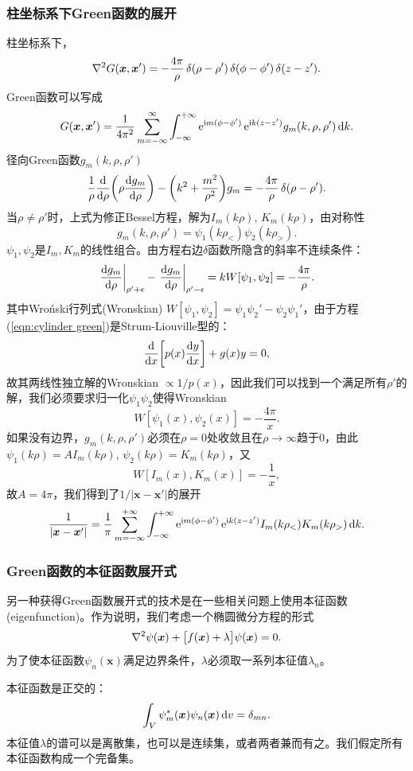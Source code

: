 \subsubsection{柱坐标系下Green函数的展开}
柱坐标系下，
\[
    \nabla^2 G(\bm x,\bm x')=-\frac{4\pi}\rho\mathop{}\!\delta(\rho-\rho')\mathop{}\!\delta(\phi-\phi')\mathop{}\!\delta(z-z').
\]
Green函数可以写成
\[
    G(\bm x,\bm x')=\frac1{4\pi^2}\sum_{m=-\infty}^\infty\int_{-\infty}^{+\infty}\mathop{}\!\mathrm{e}^{\mathrm{i} m(\phi-\phi')}\mathop{}\!\mathrm{e}^{\mathrm{i} k(z-z')}g_m(k,\rho,\rho')\mathop{}\!\mathrm{d} k.
\]
径向Green函数$g_m(k,\rho,\rho')$
\begin{equation} 
    \label{eqn:cylinder green}
    \frac1\rho\dd\rho\biggkh{\rho\dv{g_m}\rho}-\biggkh{k^2+\frac{m^2}{\rho^2}}g_m=-\frac{4\pi}\rho\vd(\rho-\rho').
\end{equation}
当$\rho\neq\rho'$时，上式为修正Bessel方程，解为$I_m(k\rho),\,K_m(k\rho)$，由对称性
\[
    g_m(k,\rho,\rho')=\psi_1(k\rho_<)\psi_2(k\rho_>).
\]
$\psi_1,\psi_2$是$I_m,K_m$的线性组合。由方程右边$\delta$函数所隐含的斜率不连续条件：
\[
    \edg{\dv{g_m}\rho}_{\rho'+\epsilon}-\edg{\dv{g_m}\rho}_{\rho'-\epsilon}=kW[\psi_1,\psi_2]=-\frac{4\pi}\rho.
\]
其中Wro\'nski行列式(Wronskian) $W[\psi_1,\psi_2]=\psi_1\psi_2'-\psi_2\psi_1'$，由于方程(\ref{eqn:cylinder green})是Strum-Liouville型的：
\[
    \dd x\biggfkh{p(x)\dv yx}+g(x)y=0,
\]
故其两线性独立解的Wronskian $\propto 1/p(x)$，因此我们可以找到一个满足所有$\rho'$的解，我们必须要求归一化$\psi_1\psi_2$使得Wronskian
\[
    W[\psi_1(x),\psi_2(x)]=-\frac{4\pi}x.
\]
如果没有边界，$g_m(k,\rho,\rho')$必须在$\rho=0$处收敛且在$\rho\to\infty$趋于0，由此$\psi_1(k\rho)=AI_m(k\rho),\,\psi_2(k\rho)=K_m(k\rho)$，又
\[
    W[I_m(x),K_m(x)]=-\frac1x,
\]
故$A=4\pi$，我们得到了$1/|\bm x-\bm x'|$的展开 
\begin{equation}
    \frac1{|\bm x-\bm x'|}=\frac1\pi\sum_{m=-\infty}^{+\infty}\int_{-\infty}^{+\infty}\mathop{}\!\mathrm{e}^{\mathrm{i} m(\phi-\phi')}\mathop{}\!\mathrm{e}^{\mathrm{i} k(z-z')}I_m(k\rho_<)K_m(k\rho_>)\mathop{}\!\mathrm{d} k.
\end{equation}
\subsubsection{Green函数的本征函数展开式}
另一种获得Green函数展开式的技术是在一些相关问题上使用本征函数(eigenfunction)。作为说明，我们考虑一个椭圆微分方程的形式
\begin{equation}
    \nabla^2\psi(\bm x)+\bigl[f(\bm x)+\lambda\bigr]\psi(\bm x)=0.
\end{equation}
为了使本征函数$\psi_n(\bm x)$满足边界条件，$\lambda$必须取一系列本征值$\lambda_n$。

本征函数是正交的：
\[
    \int_V\psi_m^\ast(\bm x)\psi_n(\bm x)\mathop{}\!\mathrm{d} v=\mathop{}\!\delta_{mn}.
\]
本征值$\lambda$的谱可以是离散集，也可以是连续集，或者两者兼而有之。我们假定所有本征函数构成一个完备集。

